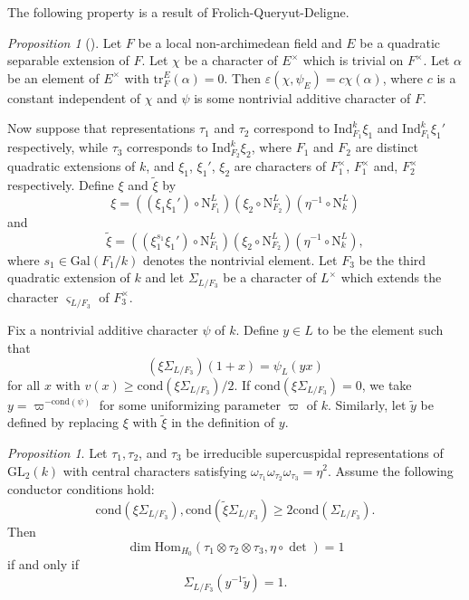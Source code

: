 \documentclass[12pt]{amsart}
\newcommand{\Gal}{{\mathrm{Gal}}}
\newcommand{\GL}{{\mathrm{GL}}}
\newcommand{\Hom}{{\mathrm{Hom}}}
\newcommand{\tr}{{\mathrm{tr}}}
\theoremstyle{Theorem}
\theoremstyle{Theorem}
\theoremstyle{Theorem}
\theoremstyle{Theorem}
\theoremstyle{Plain}
\theoremstyle{remark}
\theoremstyle{remark}
\theoremstyle{Definition}
\newtheorem{prpd}[dfn]{Proposition}
\begin{document}
The following property is a result of Frolich-Queryut-Deligne.

\begin{prpd}[{\cite[Theorem 1.4]{Tunnell}}]
    \label{t 1.4}
    Let $F$ be a local non-archimedean field and $E$ be a quadratic separable extension of $F$. Let $\chi$ be a character of $E^\times$ which is trivial on $F^\times$. Let $\alpha$ be an element of $E^\times$ with $ \tr^E_F ( \alpha ) = 0 $. Then $ \varepsilon \left( \chi, \psi_E \right) = c \chi ( \alpha ) $, where $c$ is a constant independent of $\chi$ and $\psi$ is some nontrivial additive character of $F$.
\end{prpd}

Now suppose that representations $\tau_1$ and $\tau_2$ correspond to $ \mathrm{Ind}^k_{ F_1 } \xi_1 $ and $ \mathrm{Ind}^k_{ F_1 } \xi_1' $ respectively, while $\tau_3$ corresponds to $ \mathrm{Ind}^k_{ F_2 } \xi_2 $, where $F_1$ and $F_2$ are distinct quadratic extensions of $k$, and $\xi_1$, $\xi_1'$, $\xi_2$ are characters of $F_1^\times$, $F_1^\times$ and, $F_2^\times$ respectively. Define $\xi$ and $ \widetilde{ \xi } $ by
\[
    \xi = \left( \left( \xi_1 \xi_1' \right) \circ \mathrm{N}^L_{ F_1 } \right) \left( \xi_2 \circ \mathrm{N}^L_{ F_2 } \right) \left( \eta^{-1} \circ \mathrm{N}^L_k \right)
\]
and
\[
    \widetilde{ \xi } = \left( \left( \xi_1^{ s_1 } \xi_1' \right) \circ \mathrm{N}^L_{ F_1 } \right) \left( \xi_2 \circ \mathrm{N}^L_{ F_2 } \right) \left( \eta^{-1} \circ \mathrm{N}^L_k \right),
\]
where $ s_1 \in \Gal ( F_1/k ) $ denotes the nontrivial element.  Let $F_3$ be the third quadratic extension of $k$ and let $\Sigma_{ L/F_3 }$ be a character of $L^\times$ which extends the character $ \varsigma_{ L/F_3 } $ of $F_3^\times$. 
        
Fix a nontrivial additive character $\psi$ of $k$. Define $ y \in L $ to be the element such that 
\[
    \left( \xi \Sigma_{ L/F_3 } \right) (1 + x) = \psi_L ( yx )
\]
for all $x$ with $ v(x) \ge \mathrm{cond} \left( \xi \Sigma_{ L/F_3 } \right) / 2 $. If $ \mathrm{cond} \left( \xi \Sigma_{ L/F_3 } \right) = 0 $, we take $ y = \varpi^{ -\mathrm{cond} ( \psi ) } $ for some uniformizing parameter $\varpi$ of $k$. Similarly, let $ \widetilde{y} $ be defined by replacing $\xi$ with $ \widetilde{ \xi } $ in the definition of $y$.

\begin{prpd}
    \label{cr2}
    Let $\tau_1, \tau_2$, and $\tau_3$ be irreducible  supercuspidal representations of $\GL_2(k)$ with central characters satisfying $\omega_{ \tau_1 } \omega_{ \tau_2 } \omega_{ \tau_3 } = \eta^2 $. Assume the following conductor conditions hold:
    \[
        \mathrm{cond} \left( \xi \Sigma_{ L/F_3 } \right), \mathrm{cond} \left( \widetilde{ \xi } \Sigma_{ L/F_3 } \right) \ge 2 \mathrm{cond} \left( \Sigma_{ L/F_3 } \right).
    \]
    Then
    \[
        \dim \Hom_{ H_0 } \left( \tau_1 \otimes \tau_2 \otimes \tau_3, \eta \circ \det \right) = 1
    \]
    if and only if 
    \[
        \Sigma_{ L/F_3 } ( y^{-1} \widetilde{y} ) = 1.
    \]
\end{prpd}
    
\end{document}
